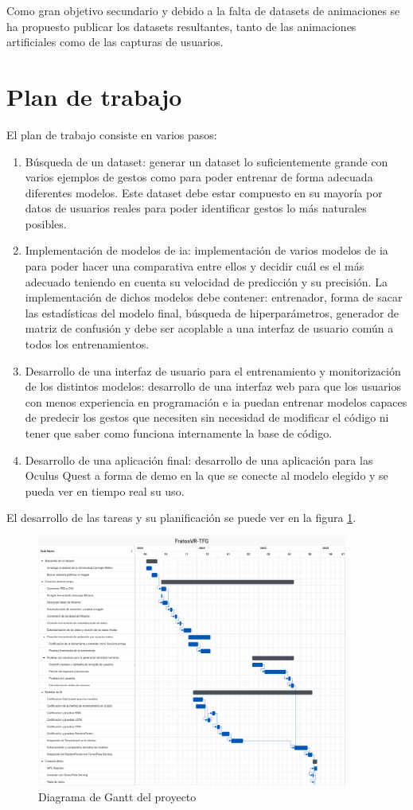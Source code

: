 Como gran objetivo secundario y debido a la falta de datasets de animaciones se ha propuesto publicar los datasets resultantes, tanto de las animaciones artificiales como de las capturas de usuarios.

\section{Plan de trabajo}
El plan de trabajo consiste en varios pasos:
\begin{enumerate}
	\item Búsqueda de un dataset: generar un dataset lo suficientemente grande con varios ejemplos de gestos como para poder entrenar de forma adecuada diferentes modelos. Este dataset debe estar compuesto en su mayoría por datos de usuarios reales para poder identificar gestos lo más naturales posibles.
	\item Implementación de modelos de \gls{ia}: implementación de varios modelos de \gls{ia} para poder hacer una comparativa entre ellos y decidir cuál es el más adecuado teniendo en cuenta su velocidad de predicción y su precisión. La implementación de dichos modelos debe contener: entrenador, forma de sacar las estadísticas del modelo final, búsqueda de hiperparámetros, generador de matriz de confusión y debe ser acoplable a una interfaz de usuario común a todos los entrenamientos.
	\item Desarrollo de una interfaz de usuario para el entrenamiento y monitorización de los distintos modelos: desarrollo de una interfaz web para que los usuarios con menos experiencia en programación e \gls{ia} puedan entrenar modelos capaces de predecir los gestos que necesiten sin necesidad de modificar el código ni tener que saber como funciona internamente la base de código.
	\item Desarrollo de una aplicación final: desarrollo de una aplicación para las Oculus Quest a forma de demo en la que se conecte al modelo elegido y se pueda ver en tiempo real su uso.
\end{enumerate}

El desarrollo de las tareas y su planificación se puede ver en la figura \ref{fig:diagrama-gantt}.

\begin{figure}[H]
	\centering
	\includegraphics[width=0.91\textwidth]{Imagenes/Vectorial/Diagrama-gannt.pdf}
	\caption{Diagrama de Gantt del proyecto}
	\label{fig:diagrama-gantt}
\end{figure}

